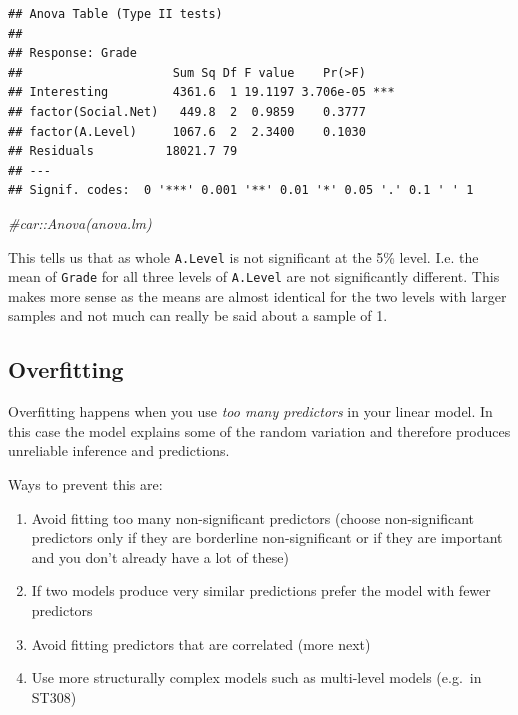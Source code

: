 \documentclass[
]{gitbook}
\newenvironment{Shaded}{\begin{snugshade}}{\end{snugshade}}
\newcommand{\CommentTok}[1]{\textcolor[rgb]{0.56,0.35,0.01}{\textit{#1}}}
\providecommand{\tightlist}{%
  \setlength{\itemsep}{0pt}\setlength{\parskip}{0pt}}
\begin{document}
\begin{verbatim}
## Anova Table (Type II tests)
## 
## Response: Grade
##                     Sum Sq Df F value    Pr(>F)    
## Interesting         4361.6  1 19.1197 3.706e-05 ***
## factor(Social.Net)   449.8  2  0.9859    0.3777    
## factor(A.Level)     1067.6  2  2.3400    0.1030    
## Residuals          18021.7 79                      
## ---
## Signif. codes:  0 '***' 0.001 '**' 0.01 '*' 0.05 '.' 0.1 ' ' 1
\end{verbatim}

\begin{Shaded}
\begin{Highlighting}[]
\CommentTok{\#car::Anova(anova.lm)}
\end{Highlighting}
\end{Shaded}

This tells us that as whole \texttt{A.Level} is not significant at the 5\% level. I.e. the mean of \texttt{Grade} for all three levels of \texttt{A.Level} are not significantly different. This makes more sense as the means are almost identical for the two levels with larger samples and not much can really be said about a sample of 1.

\hypertarget{overfitting}{%
\subsection{Overfitting}\label{overfitting}}

Overfitting happens when you use \emph{too many predictors} in your linear model. In this case the model explains some of the random variation and therefore produces unreliable inference and predictions.

Ways to prevent this are:

\begin{enumerate}
\def\labelenumi{\arabic{enumi}.}
\tightlist
\item
  Avoid fitting too many non-significant predictors (choose non-significant predictors only if they are borderline non-significant or if they are important and you don't already have a lot of these)
\item
  If two models produce very similar predictions prefer the model with fewer predictors
\item
  Avoid fitting predictors that are correlated (more next)
\item
  Use more structurally complex models such as multi-level models (e.g.~in ST308)
\end{enumerate}
\end{document}
